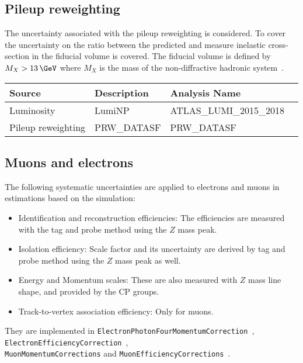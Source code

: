\subsection*{Pileup reweighting}
The uncertainty associated with the pileup reweighting is considered\cite{ExtendedPileupReweighting}. To cover the uncertainty on the ratio between the predicted and measure inelastic cross-section in the fiducial volume is covered. The fiducial volume is defined by $M_X > 13\,\GeV$ where $M_X$ is the mass of the non-diffractive hadronic system~\cite{STDM-2015-05}.

 \begin{table}[!hp]
  \centering
  \footnotesize
  \begin{center}
    \begin{tabular}{|l|l|l|l|}
      \hline
      Source             & Description   & Analysis Name    \\ \hline
      Luminosity         & LumiNP        & ATLAS\_LUMI\_2015\_2018 \\ \hline
      Pileup reweighting & PRW\_DATASF   & PRW\_DATASF       \\\hline       
    \end{tabular}
    \end{center}
  \label{tab:syst_summary_sources_1}
 \end{table}



\subsection*{Muons and electrons}
The following systematic uncertainties are applied to electrons and muons in estimations based on the simulation:

\begin{itemize}
\item Identification and reconstruction efficiencies: The efficiencies are measured with the tag and probe method using the $Z$ mass peak.
\item Isolation efficiency: Scale factor and its uncertainty are derived by tag and probe method using the $Z$ mass peak as well.
\item Energy and Momentum scales: These are also measured with $Z$ mass line shape, and provided by the CP groups.
\item Track-to-vertex association efficiency: Only for muons.
\end{itemize}

They are implemented in \texttt{ElectronPhotonFourMomentumCorrection}~\cite{EgammaCalibration},\\
\texttt{ElectronEfficiencyCorrection}~\cite{AsgElectronEfficiencyCorrectionTool}, \\
\texttt{MuonMomentumCorrections} and \texttt{MuonEfficiencyCorrections}~\cite{MCPAnalysisGuidelines}.


